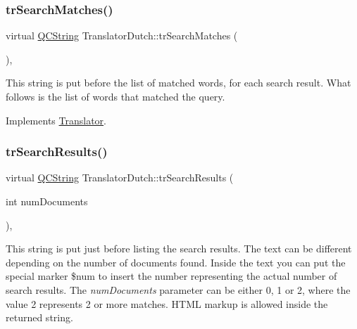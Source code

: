 \mbox{\label{class_translator_dutch_a1019f27a064742c6911e489f49425499}} 
\subsubsection{\texorpdfstring{trSearchMatches()}{trSearchMatches()}}
{\footnotesize\ttfamily virtual \mbox{\hyperlink{class_q_c_string}{Q\+C\+String}} Translator\+Dutch\+::tr\+Search\+Matches (\begin{DoxyParamCaption}{ }\end{DoxyParamCaption})\hspace{0.3cm}{\ttfamily [inline]}, {\ttfamily [virtual]}}

This string is put before the list of matched words, for each search result. What follows is the list of words that matched the query. 

Implements \mbox{\hyperlink{class_translator}{Translator}}.

\mbox{\label{class_translator_dutch_addfdb209e4f26e4898a6b9b1a1a821de}} 
\subsubsection{\texorpdfstring{trSearchResults()}{trSearchResults()}}
{\footnotesize\ttfamily virtual \mbox{\hyperlink{class_q_c_string}{Q\+C\+String}} Translator\+Dutch\+::tr\+Search\+Results (\begin{DoxyParamCaption}\item[{int}]{num\+Documents }\end{DoxyParamCaption})\hspace{0.3cm}{\ttfamily [inline]}, {\ttfamily [virtual]}}

This string is put just before listing the search results. The text can be different depending on the number of documents found. Inside the text you can put the special marker \$num to insert the number representing the actual number of search results. The {\itshape num\+Documents} parameter can be either 0, 1 or 2, where the value 2 represents 2 or more matches. H\+T\+ML markup is allowed inside the returned string. 

